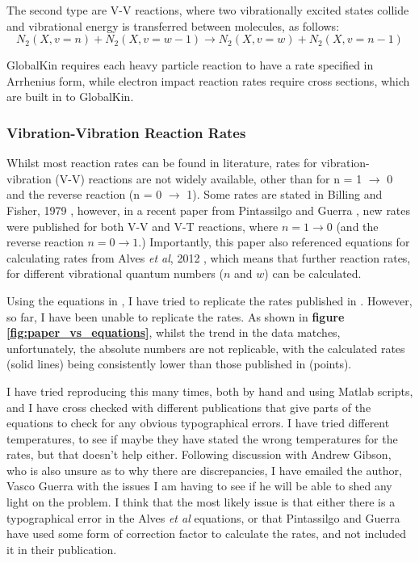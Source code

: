 \documentclass[11pt, oneside]{article}   	%
\begin{document}
The second type are V-V reactions, where two vibrationally excited states collide and vibrational energy is transferred between molecules, as follows:
\begin{equation}
N_2(X,v=n) + N_2 (X,v=w-1) \rightarrow N_2(X,v=w) + N_2(X,v=n-1)
\label{eqn:V-V}
\end{equation}

GlobalKin requires each heavy particle reaction to have a rate specified in Arrhenius form, while electron impact reaction rates require cross sections, which are built in to GlobalKin.

\subsubsection{Vibration-Vibration Reaction Rates}

Whilst most reaction rates can be found in literature, rates for vibration-vibration (V-V) reactions are not widely available, other than for n = 1 $\rightarrow$ 0 and the reverse reaction (n = 0 $\rightarrow$ 1).
Some rates are stated in Billing and Fisher, 1979 \cite{Billing1979vv}, however, in a recent paper from Pintassilgo and Guerra \cite{Pintassilgo2017modelling}, new rates were published for both V-V and V-T reactions, where $n = 1 \rightarrow 0$ (and the reverse reaction $n = 0 \rightarrow 1$.) 
Importantly, this paper also referenced equations for calculating rates from Alves \textit{et al}, 2012 \cite{Alves2012capacitively}, which means that further reaction rates, for different vibrational quantum numbers ($n$ and $w$) can be calculated.

Using the equations in \cite{Alves2012capacitively}, I have tried to replicate the rates published in \cite{Pintassilgo2017modelling}.
However, so far, I have been unable to replicate the rates.
As shown in \textbf{figure \ref{fig:paper_vs_equations}}, whilst the trend in the data matches, unfortunately, the absolute numbers are not replicable, with the calculated rates (solid lines) being consistently lower than those published in \cite{Pintassilgo2017modelling} (points).

I have tried reproducing this many times, both by hand and using Matlab scripts, and I have cross checked with different publications that give parts of the equations to check for any obvious typographical errors. 
I have tried different temperatures, to see if maybe they have stated the wrong temperatures for the rates, but that doesn't help either.
Following discussion with Andrew Gibson, who is also unsure as to why there are discrepancies, I have emailed the author, Vasco Guerra with the issues I am having to see if he will be able to shed any light on the problem.
I think that the most likely issue is that either there is a typographical error in the Alves \textit{et al} equations, or that Pintassilgo and Guerra have used some form of correction factor to calculate the rates, and not included it in their publication. 
\end{document}
